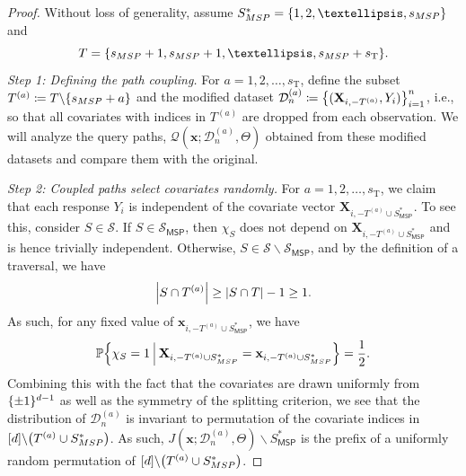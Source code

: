 \documentclass[11pt]{article}
\newcommand{\bx}{\mathbf{x}}
\newcommand{\bX}{\mathbf{X}}
\DeclarePairedDelimiter{\braces}{\lbrace}{\rbrace}
\DeclarePairedDelimiter{\paren}{(}{)}
\DeclarePairedDelimiter{\abs}{|}{|}
\renewcommand{\P}{\mathbb{P}}
\newcommand{\cell}{\mathcal{C}}
\newcommand{\sparsity}{s}
\newcommand{\nfeats}{d}
\newcommand{\nsamples}{n}
\newcommand{\coordindices}{[\nfeats]}
\newcommand{\data}[1][n]{\mathcal{D}_{#1}}
\newcommand{\featindices}{J}
\renewcommand{\path}{\mathcal{Q}}
\newcommand{\MSP}{\textsf{MSP}}
\newcommand{\suppset}{S^*}
\newcommand{\monomial}{\chi}
\newcommand{\traversal}{T}
\newcommand{\fcoefs}{\mathcal{S}}
\newcommand{\querypath}{\mathcal{Q}}
\newcommand{\traversalsize}{\sparsity_{\operatorname{T}}}
\begin{document}
\begin{proof}
    Without loss of generality, assume $\suppset_{\MSP} = \braces*{1,2,\ldots,\sparsity_{\MSP}}$ and
    \begin{equation}
        \traversal = \braces*{\sparsity_{\MSP}+1,\sparsity_{\MSP}+1,\ldots,\sparsity_{\MSP}+\traversalsize}.
    \end{equation}
    \textit{Step 1: Defining the path coupling.}
    For $a=1,2,\ldots,\traversalsize$, define the subset $\traversal^{(a)} \coloneqq \traversal\backslash\braces*{\sparsity_{\MSP}+a}$ and the modified dataset $\data^{(a)} \coloneqq \braces*{(\bX_{i,-\traversal^{(a)}},Y_i)}_{i=1}^\nsamples$, i.e., so that all covariates with indices in $\traversal^{(a)}$ are dropped from each observation.
    We will analyze the query paths, $\querypath(\bx;\data^{(a)},\Theta)$ obtained from these modified datasets and compare them with the original.

    \textit{Step 2: Coupled paths select covariates randomly.}
    For $a=1,2,\ldots,\traversalsize$, we claim that each response $Y_i$ is independent of the covariate vector $\bX_{i,-\traversal^{(a)}\cup\suppset_{\MSP}}$.
    To see this, consider $S \in \fcoefs$.
    If $S \in \fcoefs_{\MSP}$, then $\monomial_S$ does not depend on $\bX_{i,-\traversal^{(a)}\cup\suppset_{\MSP}}$ and is hence trivially independent.
    Otherwise, $S \in \fcoefs\backslash\fcoefs_{\MSP}$, and by the definition of a traversal, we have
    \begin{equation}
        \abs*{S\cap \traversal^{(a)}} \geq \abs*{S\cap\traversal} - 1 \geq 1.
    \end{equation}
    As such, for any fixed value of $\bx_{i,-\traversal^{(a)}\cup\suppset_{\MSP}}$, we have
    \begin{equation}
        \P\braces*{\monomial_S = 1 ~\vline~ \bX_{i,-\traversal^{(a)}\cup\suppset_{\MSP}} = \bx_{i,-\traversal^{(a)}\cup\suppset_{\MSP}}} = \frac{1}{2}.
    \end{equation}
    Combining this with the fact that the covariates are drawn uniformly from $\braces{\pm 1}^{\nfeats-1}$ as well as the symmetry of the splitting criterion, we see that the distribution of $\data^{(a)}$ is invariant to permutation of the covariate indices in $\coordindices\backslash\paren*{\traversal^{(a)}\cup\suppset_{\MSP}}$.
    As such, $J(\bx;\data^{(a)},\Theta)\backslash\suppset_{\MSP}$ is the prefix of a uniformly random permutation of $\coordindices\backslash\paren*{\traversal^{(a)}\cup\suppset_{\MSP}}$.


\end{proof}
\end{document}
